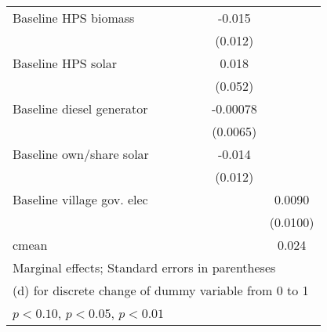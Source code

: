 \begin{table}[htbp]
\begin{tabular*}{1\hsize}{@{\hskip\tabcolsep\extracolsep\fill}l*{6}{c}}
Baseline HPS biomass&                  &                  &                  &                  &   -0.015         &                  \\
                &                  &                  &                  &                  &  (0.012)         &                  \\
Baseline HPS solar&                  &                  &                  &                  &    0.018         &                  \\
                &                  &                  &                  &                  &  (0.052)         &                  \\
Baseline diesel generator&                  &                  &                  &                  & -0.00078         &                  \\
                &                  &                  &                  &                  & (0.0065)         &                  \\
Baseline own/share solar&                  &                  &                  &                  &   -0.014         &                  \\
                &                  &                  &                  &                  &  (0.012)         &                  \\
Baseline village gov. elec&                  &                  &                  &                  &                  &   0.0090         \\
                &                  &                  &                  &                  &                  & (0.0100)         \\
\midrule
cmean           &                  &                  &                  &                  &                  &    0.024         \\
\bottomrule
\multicolumn{7}{l}{\footnotesize Marginal effects; Standard errors in parentheses}\\
\multicolumn{7}{l}{\footnotesize  (d) for discrete change of dummy variable from 0 to 1}\\
\multicolumn{7}{l}{\footnotesize \sym{*} \(p<0.10\), \sym{**} \(p<0.05\), \sym{***} \(p<0.01\)}\\
\end{tabular*}
\end{table}
